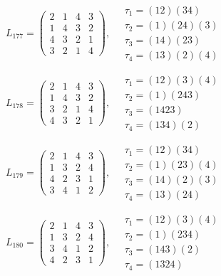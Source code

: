 $L_{177} = \begin{pmatrix} 2 & 1 & 4 & 3 \\ 1 & 4 & 3 & 2 \\ 4 & 3 & 2 & 1 \\ 3 & 2 & 1 & 4 \end{pmatrix}, \quad \begin{matrix} \tau_{1} = (1 2)(3 4) \\ \tau_{2} = (1)(2 4)(3) \\ \tau_{3} = (1 4)(2 3) \\ \tau_{4} = (1 3)(2)(4) \end{matrix}$

$L_{178} = \begin{pmatrix} 2 & 1 & 4 & 3 \\ 1 & 4 & 3 & 2 \\ 3 & 2 & 1 & 4 \\ 4 & 3 & 2 & 1 \end{pmatrix}, \quad \begin{matrix} \tau_{1} = (1 2)(3)(4) \\ \tau_{2} = (1)(2 4 3) \\ \tau_{3} = (1 4 2 3) \\ \tau_{4} = (1 3 4)(2) \end{matrix}$

$L_{179} = \begin{pmatrix} 2 & 1 & 4 & 3 \\ 1 & 3 & 2 & 4 \\ 4 & 2 & 3 & 1 \\ 3 & 4 & 1 & 2 \end{pmatrix}, \quad \begin{matrix} \tau_{1} = (1 2)(3 4) \\ \tau_{2} = (1)(2 3)(4) \\ \tau_{3} = (1 4)(2)(3) \\ \tau_{4} = (1 3)(2 4) \end{matrix}$

$L_{180} = \begin{pmatrix} 2 & 1 & 4 & 3 \\ 1 & 3 & 2 & 4 \\ 3 & 4 & 1 & 2 \\ 4 & 2 & 3 & 1 \end{pmatrix}, \quad \begin{matrix} \tau_{1} = (1 2)(3)(4) \\ \tau_{2} = (1)(2 3 4) \\ \tau_{3} = (1 4 3)(2) \\ \tau_{4} = (1 3 2 4) \end{matrix}$

